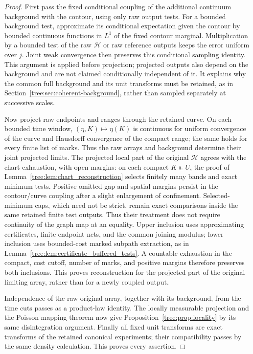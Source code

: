 \begin{proof}
First pass the fixed conditional coupling of the additional continuum
background with the contour, using only raw output tests.  For a
bounded background test, approximate its conditional expectation
given the contour by bounded continuous functions in $L^1$ of the
fixed contour marginal.  Multiplication by a bounded test of the
raw $\mathcal H$ or raw reference outputs keeps the error uniform
over $j$.  Joint weak convergence then preserves this conditional
sampling identity.  This argument is applied before projection;
projected outputs also depend on the background and are not claimed
conditionally independent of it.  It explains why the common full
background and its unit transforms must be retained, as in
Section~\ref{tree:sec:coherent-background}, rather than sampled separately at
successive scales.

Now project raw endpoints and ranges through the retained curve.
On each bounded time window, $(\eta,K)\mapsto\eta(K)$ is continuous
for uniform convergence of the curve and Hausdorff convergence of
the compact range; the same holds for every finite list of marks.
Thus the raw arrays and background determine their joint projected
limits.  The projected local part of the original $\mathcal H$
agrees with the chart exhaustion, with open margins:
on each compact $K\Subset U$, the proof of
Lemma~\ref{tree:lem:chart_reconstruction} selects finitely many bands
and exact minimum tests. Positive omitted-gap and spatial margins
persist in the contour/curve coupling after a slight enlargement
of confinement. Selected-minimum caps, which need not be strict,
remain exact comparisons inside the same retained finite test
outputs. Thus their treatment does not require continuity of the
graph map at an equality. Upper inclusion
uses approximating certificates, finite endpoint nets, and the
common joining modulus; lower inclusion uses bounded-cost marked
subpath extraction, as in
Lemma~\ref{tree:lem:certificate_buffered_tests}.  A countable exhaustion
in the compact, cost cutoff, number of marks, and positive margins
therefore preserves both inclusions.  This proves reconstruction
for the projected part of the original limiting array, rather than for a newly coupled
output.

Independence of the raw original array, together with its background,
from the time cuts passes as a product-law identity.
The locally measurable projection and the Poisson mapping theorem
now give Proposition~\ref{tree:prop:locality} by its same disintegration
argument.  Finally all fixed unit transforms are exact transforms
of the retained canonical experiments; their compatibility passes
by the same density calculation.  This proves every assertion.
\end{proof}

